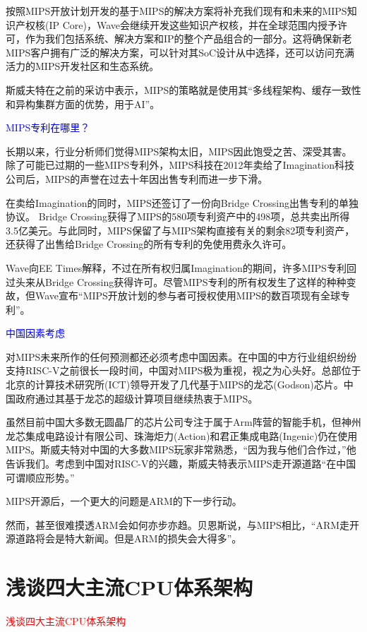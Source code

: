 \documentclass[utf8]{book}
\begin{document}
按照MIPS开放计划开发的基于MIPS的解决方案将补充我们现有和未来的MIPS知识产权核(IP Core)，Wave会继续开发这些知识产权核，并在全球范围内授予许可，作为我们包括系统、解决方案和IP的整个产品组合的一部分。这将确保新老MIPS客户拥有广泛的解决方案，可以针对其SoC设计从中选择，还可以访问充满活力的MIPS开发社区和生态系统。

斯威夫特在之前的采访中表示，MIPS的策略就是使用其“多线程架构、缓存一致性和异构集群方面的优势，用于AI”。

\textcolor{blue}{MIPS专利在哪里？}

长期以来，行业分析师们觉得MIPS架构太旧，MIPS因此饱受之苦、深受其害。除了可能已过期的一些MIPS专利外，MIPS科技在2012年卖给了Imagination科技公司后，MIPS的声誉在过去十年因出售专利而进一步下滑。

在卖给Imagination的同时，MIPS还签订了一份向Bridge Crossing出售专利的单独协议。 Bridge Crossing获得了MIPS的580项专利资产中的498项，总共卖出所得3.5亿美元。与此同时，MIPS保留了与MIPS架构直接有关的剩余82项专利资产，还获得了出售给Bridge Crossing的所有专利的免使用费永久许可。

Wave向EE Times解释，不过在所有权归属Imagination的期间，许多MIPS专利回过头来从Bridge Crossing获得许可。尽管MIPS专利的所有权发生了这样的种种变故，但Wave宣布“MIPS开放计划的参与者可授权使用MIPS的数百项现有全球专利”。

\textcolor{blue}{中国因素考虑}

对MIPS未来所作的任何预测都还必须考虑中国因素。在中国的中方行业组织纷纷支持RISC-V之前很长一段时间，中国对MIPS极为重视，视之为心头好。总部位于北京的计算技术研究所(ICT)领导开发了几代基于MIPS的龙芯(Godson)芯片。中国政府通过其基于龙芯的超级计算项目继续热衷于MIPS。

虽然目前中国大多数无圆晶厂的芯片公司专注于属于Arm阵营的智能手机，但神州龙芯集成电路设计有限公司、珠海炬力(Action)和君正集成电路(Ingenic)仍在使用MIPS。斯威夫特对中国的大多数MIPS玩家非常熟悉，“因为我与他们合作过，”他告诉我们。考虑到中国对RISC-V的兴趣，斯威夫特表示MIPS走开源道路“在中国可谓顺应形势。”

MIPS开源后，一个更大的问题是ARM的下一步行动。

然而，甚至很难摸透ARM会如何亦步亦趋。贝恩斯说，与MIPS相比，“ARM走开源道路将会是特大新闻。但是ARM的损失会大得多”。


\section{浅谈四大主流CPU体系架构}

{\LARGE \textcolor{red}{浅谈四大主流CPU体系架构}}
\end{document}
